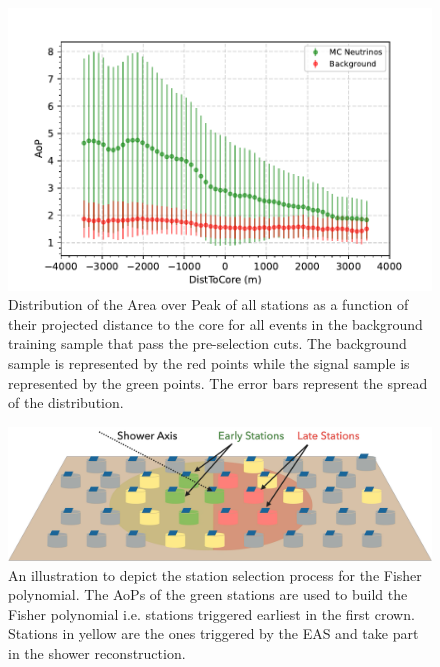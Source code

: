 \begin{figure}[h!]
  \centering
  \includegraphics[width=\textwidth]{thesis_figures/Nu_analysis/Selection_Evo_AoP_Dist_mean_redcut.pdf}
  \caption{Distribution of the Area over Peak of all stations as a function of their projected distance to the core for all events in the background training sample that pass the pre-selection cuts. The background sample is represented by the red points while the signal sample is represented by the green points. The error bars represent the spread of the distribution.}
  \label{fig:Dist_to_core}
\end{figure}


\begin{figure}[h!]
  \centering
  \includegraphics[width=\textwidth]{thesis_figures/Nu_analysis/Fisher_early_late.pdf}
  \caption{An illustration to depict the station selection process for the Fisher polynomial. The AoPs of the green stations are used to build the Fisher polynomial i.e. stations triggered earliest in the first crown. Stations in yellow are the ones triggered by the EAS and take part in the shower reconstruction.}
  \label{fig:AoP_early_late}
\end{figure}

